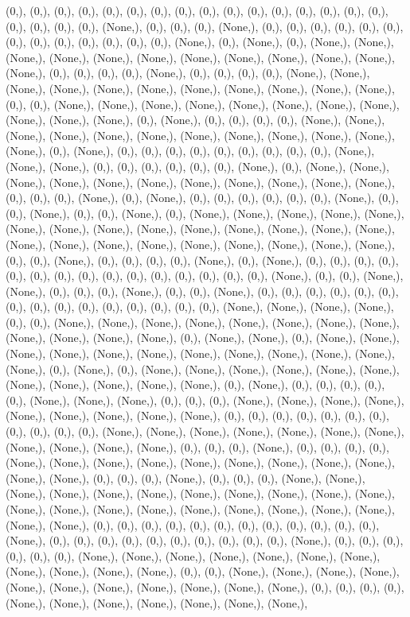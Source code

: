 \documentclass{article}
\begin{document}
(0,), (0,), (0,), (0,), (0,), (0,), (0,), (0,), (0,), (0,), (0,), (0,), (0,), (0,), (0,), (0,), (0,), (0,), (0,), (0,), (None,), (0,), (0,), (0,), (None,), (0,), (0,), (0,), (0,), (0,), (0,), (0,), (0,), (0,), (0,), (0,), (0,), (0,), (None,), (0,), (None,), (0,), (None,), (None,), (None,), (None,), (None,), (None,), (None,), (None,), (None,), (None,), (None,), (None,), (0,), (0,), (0,), (0,), (None,), (0,), (0,), (0,), (0,), (None,), (None,), (None,), (None,), (None,), (None,), (None,), (None,), (None,), (None,), (None,), (0,), (0,), (None,), (None,), (None,), (None,), (None,), (None,), (None,), (None,), (None,), (None,), (None,), (0,), (None,), (0,), (0,), (0,), (0,), (None,), (None,), (None,), (None,), (None,), (None,), (None,), (None,), (None,), (None,), (None,), (None,), (0,), (None,), (0,), (0,), (0,), (0,), (0,), (0,), (0,), (0,), (0,), (None,), (None,), (None,), (0,), (0,), (0,), (0,), (0,), (0,), (None,), (0,), (None,), (None,), (None,), (None,), (None,), (None,), (None,), (None,), (None,), (None,), (None,), (0,), (0,), (0,), (None,), (0,), (None,), (0,), (0,), (0,), (0,), (0,), (0,), (None,), (0,), (0,), (None,), (0,), (0,), (None,), (0,), (None,), (None,), (None,), (None,), (None,), (None,), (None,), (None,), (None,), (None,), (None,), (None,), (None,), (None,), (None,), (None,), (None,), (None,), (None,), (None,), (None,), (None,), (None,), (0,), (0,), (None,), (0,), (0,), (0,), (0,), (None,), (0,), (None,), (0,), (0,), (0,), (0,), (0,), (0,), (0,), (0,), (0,), (0,), (0,), (0,), (0,), (0,), (0,), (None,), (0,), (0,), (None,), (None,), (0,), (0,), (0,), (None,), (0,), (0,), (None,), (0,), (0,), (0,), (0,), (0,), (0,), (0,), (0,), (0,), (0,), (0,), (0,), (0,), (0,), (0,), (None,), (None,), (None,), (None,), (0,), (0,), (None,), (None,), (None,), (None,), (None,), (None,), (None,), (None,), (None,), (None,), (None,), (None,), (0,), (None,), (None,), (0,), (None,), (None,), (None,), (None,), (None,), (None,), (None,), (None,), (None,), (None,), (None,), (None,), (0,), (None,), (0,), (None,), (None,), (None,), (None,), (None,), (None,), (None,), (None,), (None,), (None,), (None,), (0,), (None,), (0,), (0,), (0,), (0,), (0,), (None,), (None,), (None,), (0,), (0,), (0,), (None,), (None,), (None,), (None,), (None,), (None,), (None,), (None,), (None,), (0,), (0,), (0,), (0,), (0,), (0,), (0,), (0,), (0,), (0,), (0,), (None,), (None,), (None,), (None,), (None,), (None,), (None,), (None,), (None,), (None,), (None,), (0,), (0,), (0,), (None,), (0,), (0,), (0,), (0,), (None,), (None,), (None,), (None,), (None,), (None,), (None,), (None,), (None,), (None,), (None,), (0,), (0,), (0,), (None,), (0,), (0,), (0,), (None,), (None,), (None,), (None,), (None,), (None,), (None,), (None,), (None,), (None,), (None,), (None,), (None,), (None,), (None,), (None,), (None,), (None,), (None,), (None,), (None,), (None,), (0,), (0,), (0,), (0,), (0,), (0,), (0,), (0,), (0,), (0,), (0,), (0,), (None,), (0,), (0,), (0,), (0,), (0,), (0,), (0,), (0,), (0,), (0,), (None,), (0,), (0,), (0,), (0,), (0,), (0,), (None,), (None,), (None,), (None,), (None,), (None,), (None,), (None,), (None,), (None,), (None,), (0,), (0,), (None,), (None,), (None,), (None,), (None,), (None,), (None,), (None,), (None,), (None,), (None,), (0,), (0,), (0,), (0,), (None,), (None,), (None,), (None,), (None,), (None,), (None,), 
\end{document}
